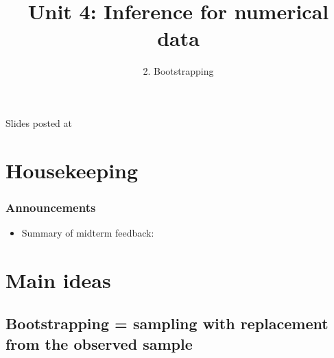 \documentclass[11pt,containsverbatim,handout,xcolor=xelatex,dvipsnames,table]{beamer}
\title{Unit 4: Inference for numerical data}
\subtitle{2. Bootstrapping}
\author{\CourseName}
\date{}
\institute{\InstituteName}
\begin{document}



\begin{frame}[plain]

\titlepage

\vfill

{\scriptsize {} \hfill Slides posted at  \webURL{\CourseSite}}

\addtocounter{framenumber}{-1} 

\end{frame}


\section{Housekeeping}


\begin{frame}
\frametitle{Announcements}

\begin{itemize}

\item Summary of midterm feedback:

\end{itemize}

\end{frame}


\section{Main ideas}


\subsection{Bootstrapping = sampling with replacement from the observed sample}
\label{mi1}

\end{document}
